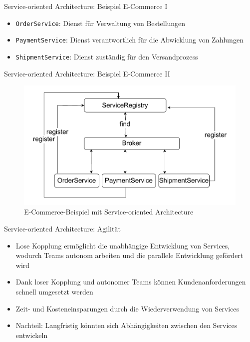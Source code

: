 \begin{frame}{Service-oriented Architecture: Beispiel E-Commerce I}
  \begin{itemize}
    \item \texttt{OrderService}: Dienst für Verwaltung von Bestellungen
    \item \texttt{PaymentService}: Dienst verantwortlich für die Abwicklung von Zahlungen
    \item \texttt{ShipmentService}: Dienst zuständig für den Versandprozess
  \end{itemize}
\end{frame}

\begin{frame}{Service-oriented Architecture: Beispiel E-Commerce II}
  \begin{figure}[!h]
    \centering
    \includegraphics[scale=0.55]{imglib/soa/soa-example}
    \caption{E-Commerce-Beispiel mit Service-oriented Architecture}
    \label{fig:soaecommerce}
  \end{figure}
\end{frame}

\begin{frame}{Service-oriented Architecture: Agilität}
  \begin{itemize}
    \item Lose Kopplung ermöglicht die unabhängige Entwicklung von Services, wodurch Teams autonom arbeiten und die parallele Entwicklung gefördert wird
    \item Dank loser Kopplung und autonomer Teams können Kundenanforderungen schnell umgesetzt werden
    \item Zeit- und Kosteneinsparungen durch die Wiederverwendung von Services
    \item Nachteil: Langfristig könnten sich Abhängigkeiten zwischen den Services entwickeln
    \end{itemize}
\end{frame}
